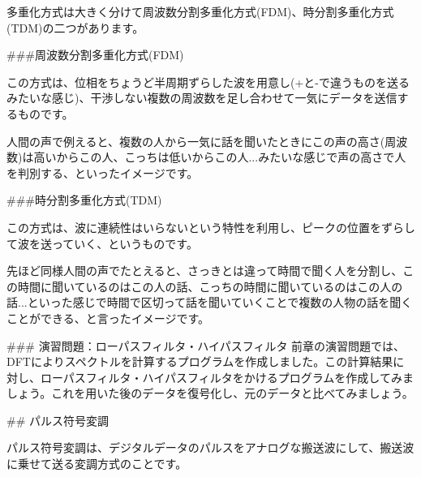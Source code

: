 多重化方式は大きく分けて周波数分割多重化方式(FDM)、時分割多重化方式(TDM)の二つがあります。

###周波数分割多重化方式(FDM)

この方式は、位相をちょうど半周期ずらした波を用意し(+と-で違うものを送るみたいな感じ)、干渉しない複数の周波数を足し合わせて一気にデータを送信するものです。

人間の声で例えると、複数の人から一気に話を聞いたときにこの声の高さ(周波数)は高いからこの人、こっちは低いからこの人...みたいな感じで声の高さで人を判別する、といったイメージです。

###時分割多重化方式(TDM)

この方式は、波に連続性はいらないという特性を利用し、ピークの位置をずらして波を送っていく、というものです。

先ほど同様人間の声でたとえると、さっきとは違って時間で聞く人を分割し、この時間に聞いているのはこの人の話、こっちの時間に聞いているのはこの人の話...といった感じで時間で区切って話を聞いていくことで複数の人物の話を聞くことができる、と言ったイメージです。

### 演習問題：ローパスフィルタ・ハイパスフィルタ
前章の演習問題では、DFTによりスペクトルを計算するプログラムを作成しました。この計算結果に対し、ローパスフィルタ・ハイパスフィルタをかけるプログラムを作成してみましょう。これを用いた後のデータを復号化し、元のデータと比べてみましょう。

## パルス符号変調

パルス符号変調は、デジタルデータのパルスをアナログな搬送波にして、搬送波に乗せて送る変調方式のことです。


